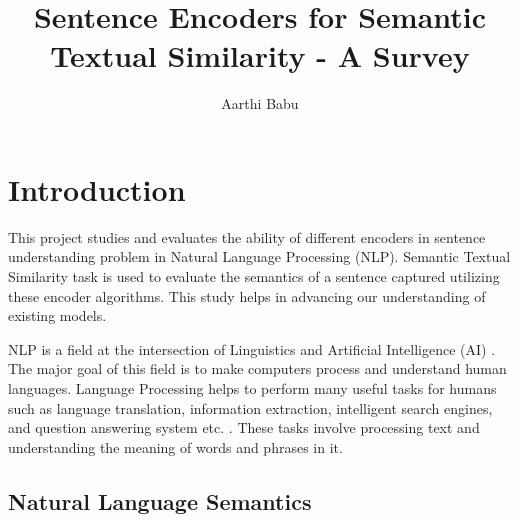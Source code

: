 \documentclass[12pt]{report} %
\title{Sentence Encoders for Semantic Textual Similarity - A Survey}
\author{Aarthi Babu}
\begin{document}
\maketitle
\tableofcontents
\newpage



\chapter{Introduction}


	This project studies and evaluates the ability of different encoders in sentence understanding problem in Natural Language Processing (NLP). Semantic Textual Similarity task is used to evaluate the semantics of a sentence captured utilizing these encoder algorithms. This study helps in advancing our understanding of existing models.
	
	NLP is a field at the intersection of Linguistics and Artificial Intelligence (AI) \citep{jurafsky2014speech}. The major goal of this field is to make computers process and understand human languages. Language Processing helps to perform many useful tasks for humans such as language translation, information extraction, intelligent search engines, and question answering system etc. \citep{jurafsky2014speech}. These tasks involve processing text and understanding the meaning of words and phrases in it. 
	
	\section{Natural Language Semantics}
	
\end{document}
